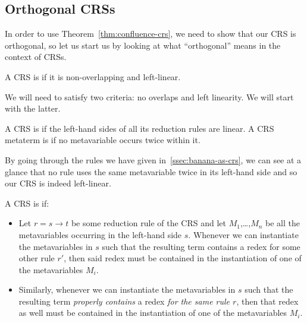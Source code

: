 \subsection{Orthogonal CRSs}
\label{ssec:orthogonal-crs}

In order to use Theorem~\ref{thm:confluence-crs}, we need to show that our
CRS is orthogonal, so let us start us by looking at what ``orthogonal''
means in the context of CRSs.

\begin{definition}
  A CRS is  if it is non-overlapping and left-linear.
\end{definition}

We will need to satisfy two criteria: no overlaps and left linearity. We
will start with the latter.

\begin{definition}
  A CRS is  if the left-hand sides of all its reduction
  rules are linear. A CRS metaterm is  if no metavariable
  occurs twice within it.
\end{definition}

By going through the rules we have given in~\ref{ssec:banana-as-crs}, we
can see at a glance that no rule uses the same metavariable twice in its
left-hand side and so our CRS is indeed left-linear.

\begin{definition}
  A CRS is  if:
  \begin{itemize}
    \item Let $r = s \to t$ be some reduction rule of the CRS and let
      $M_1$,\ldots,$M_n$ be all the metavariables occurring in the
      left-hand side $s$. Whenever we can instantiate the metavariables in
      $s$ such that the resulting term contains a redex for some other rule
      $r'$, then said redex must be contained in the instantiation of one
      of the metavariables $M_i$.
    \item Similarly, whenever we can instantiate the metavariables in $s$
      such that the resulting term \emph{properly contains} a redex
      \emph{for the same rule $r$}, then that redex as well must be
      contained in the instantiation of one of the metavariables $M_i$.
  \end{itemize}
\end{definition}

